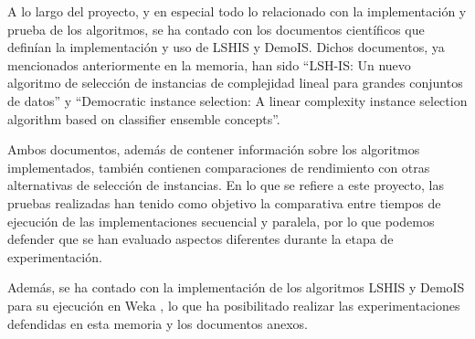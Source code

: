 A lo largo del proyecto, y en especial todo lo relacionado con la implementación y prueba de los algoritmos, se ha contado con los documentos científicos que definían la implementación y uso de LSHIS y DemoIS. Dichos documentos, ya mencionados anteriormente en la memoria, han sido ``LSH-IS: Un nuevo algoritmo de selección de instancias de complejidad lineal para grandes conjuntos de datos''\cite{LSHISPaper} y ``Democratic instance selection: A linear complexity instance selection algorithm based on classifier ensemble concepts''\cite{DemoISPaper}.

Ambos documentos, además de contener información sobre los algoritmos implementados, también contienen comparaciones de rendimiento con otras alternativas de selección de instancias. En lo que se refiere a este proyecto, las pruebas realizadas han tenido como objetivo la comparativa entre tiempos de ejecución de las implementaciones secuencial y paralela, por lo que podemos defender que se han evaluado aspectos diferentes durante la etapa de experimentación.

Además, se ha contado con la implementación de los algoritmos LSHIS y DemoIS para su ejecución en Weka \cite{arnaiz2012herramienta}, lo que ha posibilitado realizar las experimentaciones defendidas en esta memoria y los documentos anexos.
